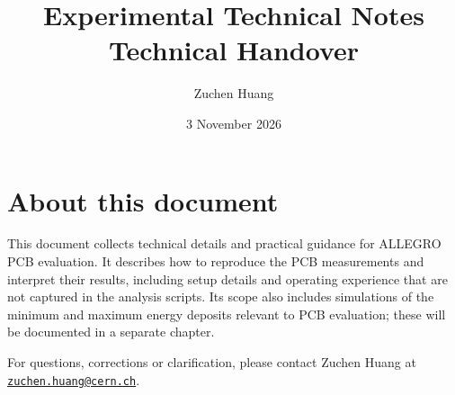 \documentclass[11pt,a4paper,oneside]{report}
\title{Experimental Technical Notes\\[8pt]\Large Technical Handover}
\author{Zuchen Huang}
\date{3 November 2026}
\begin{document}
\maketitle
\chapter*{About this document}
This document collects technical details and practical guidance for ALLEGRO PCB evaluation. It describes how to reproduce the PCB measurements and interpret their results, including setup details and operating experience that are not captured in the analysis scripts. Its scope also includes simulations of the minimum and maximum energy deposits relevant to PCB evaluation; these will be documented in a separate chapter.

For questions, corrections or clarification, please contact Zuchen Huang at \href{mailto:zuchen.huang@cern.ch}{\nolinkurl{zuchen.huang@cern.ch}}.
\begingroup
\small
\setlength{\parskip}{0pt}
\tableofcontents
\endgroup


\end{document}
